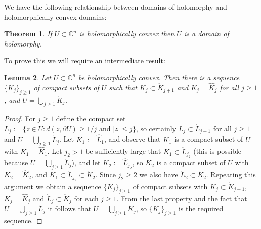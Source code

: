 \documentclass[11pt,a4paper, final, twoside]{article}
\newtheorem{theorem}{Theorem}
\newtheorem{lemma}[theorem]{Lemma}
\numberwithin{equation}{section}
\newcommand{\C}{\mathbb C}
\newcommand{\bd}{\partial}
\newcommand{\inter}[1]{\mathring{#1}}
\newcommand{\emetric}{d}
\begin{document}
We have the following relationship between domains of holomorphy and holomorphically convex domains:
\begin{theorem}
\label{hcdh}
If $U\subset\C^n$ is holomorphically convex then $U$ is a domain of holomorphy.
\end{theorem}
To prove this we will require an intermediate result:
\begin{lemma}
Let $U\subset\C^n$ be holomorphically convex. Then there is a sequence $\{K_j\}_{j\geq 1}$ of compact subsets of $U$ such that $K_j\subset\inter K_{j+1}$ and
$K_j=\hat K_j$ for all $j\geq 1$, and $U=\bigcup_{j\geq 1} \inter K_j$.
\end{lemma}
\begin{proof}
For $j\geq 1$ define the compact set $L_j:=\{z\in U\colon \emetric(z,\bd U)\geq 1/j \text{ and } |z|\leq j\}$, so certainly $L_j\subset\inter L_{j+1}$ for all $j\geq 1$ and $U=\bigcup_{j\geq 1}\inter L_j$.
Let $K_1:=\hat L_1$, and observe that $K_1$ is a compact subset of $U$ with $K_1=\hat K_1$. Let $j_2>1$ be sufficiently large that $K_1\subset\inter L_{j_2}$ (this is possible
because $U=\bigcup_{j\geq 1}\inter L_j$), and let $K_2:=\hat L_{j_2}$, so $K_2$ is a compact subset of $U$ with $K_2=\hat K_2$, and $K_1\subset\inter L_{j_2}\subset \inter K_2$. Since
$j_2\geq 2$ we also have $\inter L_2\subset \inter K_2$.
Repeating this argument we obtain a sequence $\{K_j\}_{j\geq 1}$ of compact subsets with $K_j\subset\inter K_{j+1}$, $K_j=\hat K_j$ and $\inter L_j\subset \inter K_j$ for each $j\geq 1$. 
From the last property and the fact that $U=\bigcup_{j\geq 1}\inter L_j$ it follows that $U=\bigcup_{j\geq 1}\inter K_j$, so $\{K_j\}_{j\geq 1}$ is the required sequence.
\end{proof}
\end{document}
